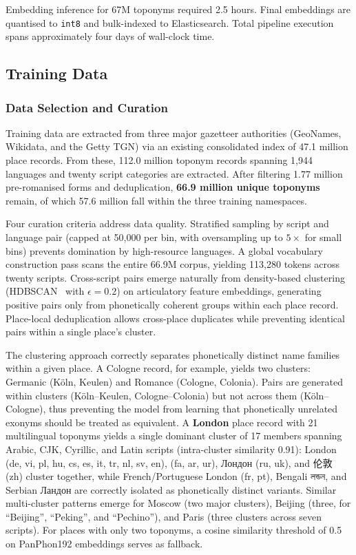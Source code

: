 \documentclass[11pt,a4paper]{article}
\newcommand{\textar}[1]{{\arabicfont\RL{#1}}}
\newcommand{\textbn}[1]{{\bengalifont #1}}
\newcommand{\textcn}[1]{{\chinesefont #1}}
\begin{document}
Embedding inference for 67M toponyms required 2.5 hours. Final embeddings are quantised to \texttt{int8} and bulk-indexed to Elasticsearch. Total pipeline execution spans approximately four days of wall-clock time.


\subsection{Training Data}
\label{subsec:data}

\subsubsection{Data Selection and Curation}
\label{subsec:selection}

Training data are extracted from three major gazetteer authorities (GeoNames, Wikidata, and the Getty TGN) via an existing consolidated index of 47.1 million place records. From these, 112.0 million toponym records spanning 1,944 languages and twenty script categories are extracted. After filtering 1.77 million pre-romanised forms and deduplication, \textbf{66.9 million unique toponyms} remain, of which 57.6 million fall within the three training namespaces.

Four curation criteria address data quality. Stratified sampling by script and language pair (capped at 50,000 per bin, with oversampling up to $5\times$ for small bins) prevents domination by high-resource languages. A global vocabulary construction pass scans the entire 66.9M corpus, yielding 113,280 tokens across twenty scripts. Cross-script pairs emerge naturally from density-based clustering (HDBSCAN~\citep{mcinnes2017hdbscan} with $\epsilon = 0.2$) on articulatory feature embeddings, generating positive pairs only from phonetically coherent groups within each place record. Place-local deduplication allows cross-place duplicates while preventing identical pairs within a single place's cluster.

The clustering approach correctly separates phonetically distinct name families within a given place. A Cologne record, for example, yields two clusters: Germanic (Köln, Keulen) and Romance (Cologne, Colonia). Pairs are generated within clusters (Köln--Keulen, Cologne--Colonia) but not across them (Köln--Cologne), thus preventing the model from learning that phonetically unrelated exonyms should be treated as equivalent. A \textbf{London} place record with 21 multilingual toponyms yields a single dominant cluster of 17 members spanning Arabic, CJK, Cyrillic, and Latin scripts (intra-cluster similarity 0.91): London (de, vi, pl, hu, cs, es, it, tr, nl, sv, en), \textar{لندن} (fa, ar, ur), Лондон (ru, uk), and \textcn{伦敦} (zh) cluster together, while French/Portuguese London (fr, pt), Bengali \textbn{লন্ডন}, and Serbian Ландон are correctly isolated as phonetically distinct variants. Similar multi-cluster patterns emerge for Moscow (two major clusters), Beijing (three, for ``Beijing'', ``Peking'', and ``Pechino''), and Paris (three clusters across seven scripts). For places with only two toponyms, a cosine similarity threshold of 0.5 on PanPhon192 embeddings serves as fallback.
\end{document}

